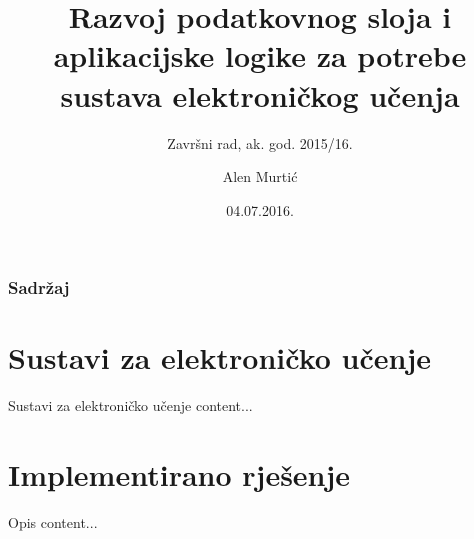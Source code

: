 \documentclass[times, utf8, numeric]{beamer}
\title{Razvoj podatkovnog sloja i aplikacijske logike za potrebe sustava elektroničkog učenja}
\subtitle{Završni rad, ak. god. 2015/16.}
\author{Alen Murtić}
\institute{Faklutet elektrotehnike i računarstva, Zagreb}
\date{04.07.2016.}
\begin{document}
\begin{frame}
	\titlepage
\end{frame}

\begin{frame}
	\frametitle{Sadržaj}
	\tableofcontents
\end{frame}

\section{Sustavi za elektroničko učenje}
\begin{frame}{Sustavi za elektroničko učenje}
	content...
\end{frame}

\section{Implementirano rješenje}
\begin{frame}{Opis}
	content...
\end{frame}
\end{document}
